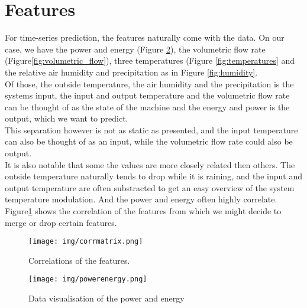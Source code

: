 \documentclass{scrartcl}
\begin{document}
\section{Features}
For time-series prediction, the features naturally come with the data. On our case, we have the power and energy (Figure \ref{fig:powerenergy}), the volumetric flow rate (Figure\ref{fig:volumetric_flow}), three temperatures (Figure \ref{fig:temperatures} and the relative air humidity and precipitation as in Figure \ref{fig:humidity}.\\
Of those, the outside temperature, the air humidity and the precipitation is the systems input, the input and output temperature and the volumetric flow rate can be thought of as the state of the machine and the energy and power is the output, which we want to predict.\\
This separation however is not as static as presented, and the input temperature can also be thought of as an input, while the volumetric flow rate could also be output.\\
It is also notable that some the values are more closely related then others. The outside temperature naturally tends to drop while it is raining, and the input and output temperature are often substracted to get an easy overview of the system temperature modulation. And the power and energy often highly correlate. Figure\ref{fig:correlate} shows the correlation of the features from which we might decide to merge or drop certain features.

\begin{figure}[H]
  \centering
  \texttt{[image: img/corrmatrix.png]}
  \caption[This is needed]{Correlations of the features.\footnotemark}
  \label{fig:correlate}
\end{figure}



\begin{figure}[H]
  \centering
  \texttt{[image: img/powerenergy.png]}
  \caption{Data visualisation of the power and energy}
  \label{fig:powerenergy}
\end{figure}
\end{document}
